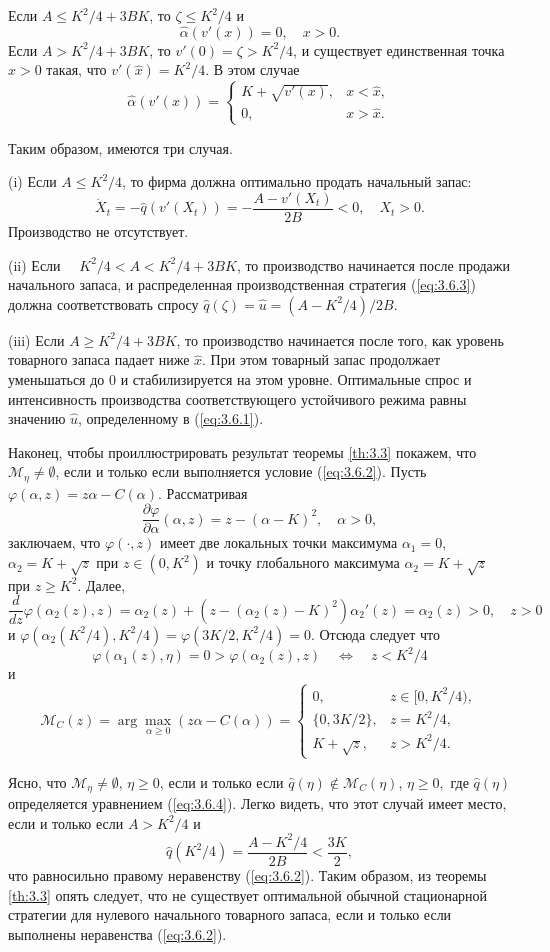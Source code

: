 Если $A\le K^2/4+3BK$, то $\zeta\le K^2/4$ и
$$ \widehat\alpha(v'(x))=0,\quad x>0.$$
Если $A>K^2/4+3BK$, то $v'(0)=\zeta>K^2/4$, и существует единственная точка $\widehat x>0$ такая, что $v'(\widehat x)=K^2/4$. В этом случае
$$ \widehat\alpha(v'(x))=\begin{cases}
K+\sqrt{v'(x)},& x<\widehat x,\\
0,& x>\widehat x.
\end{cases}$$

Таким образом, имеются три случая. 

(i) Если $A\le K^2/4$, то фирма должна оптимально продать начальный запас:
$$ \dot X_t=-\widehat q(v'(X_t))=-\frac{A-v'(X_t)}{2B}<0,\quad X_t>0.$$
Производство не отсутствует.

(ii) Если $\quad K^2/4<A< K^2/4+3BK$, то производство начинается после продажи начального запаса, и распределенная производственная стратегия (\ref{eq:3.6.3}) должна соответствовать спросу $\widehat q(\zeta)=\widehat u=(A-K^2/4)/2B$.

(iii) Если $A\ge K^2/4+3BK$, то производство начинается после того, как уровень товарного запаса падает ниже $\widehat x$. При этом товарный запас продолжает уменьшаться до $0$
и стабилизируется на этом уровне. Оптимальные спрос и интенсивность производства соответствующего устойчивого режима равны значению $\widehat u$, определенному в (\ref{eq:3.6.1}).


Наконец, чтобы проиллюстрировать результат теоремы \ref{th:3.3} покажем, что $\mathscr M_\eta\neq\emptyset$, если и только если выполняется условие (\ref{eq:3.6.2}). Пусть $\varphi(\alpha,z)=z\alpha-C(\alpha)$. Рассматривая
$$ \frac{\partial\varphi}{\partial\alpha}(\alpha,z)=z-(\alpha-K)^2,\quad \alpha>0,$$
заключаем, что $\varphi(\cdot,z)$ имеет две локальных точки максимума $\alpha_1=0$, $\alpha_2=K+\sqrt z$ при $z\in (0, K^2)$ и точку глобального максимума $\alpha_2=K+\sqrt z$ при $z\ge K^2$. Далее,
$$\frac{d}{dz}\varphi(\alpha_2(z),z)=\alpha_2(z)+(z-(\alpha_2(z)-K)^2)\alpha_2'(z) =\alpha_2(z)>0,\quad z>0$$
и $\varphi(\alpha_2(K^2/4),K^2/4)=\varphi(3K/2,K^2/4)=0.$
Отсюда следует что
$$\varphi(\alpha_1(z),\eta)=0>\varphi(\alpha_2(z),z)\quad \iff\quad z<K^2/4$$
и
$$ \mathscr M_C(z)=\arg\max_{\alpha\ge 0}(z\alpha-C(\alpha))=
\begin{cases}
0,& z\in [0,K^2/4),\\
\{0,3K/2\},& z=K^2/4,\\
K+\sqrt z,& z>K^2/4.
\end{cases}$$

Ясно, что $\mathscr M_\eta\neq\emptyset$, $\eta\ge 0$, если и только если
$\widehat q(\eta)\not\in\mathscr M_C(\eta)$, $\eta\ge 0,$ где $\widehat q(\eta)$ определяется уравнением (\ref{eq:3.6.4}).
Легко видеть, что этот случай имеет место, если и только если $A>K^2/4$ и
$$\widehat q(K^2/4)=\frac{A-K^2/4}{2B}<\frac{3K}{2},$$
что равносильно правому неравенству (\ref{eq:3.6.2}). Таким образом, из теоремы \ref{th:3.3} опять следует, что не существует оптимальной обычной стационарной стратегии для нулевого начального товарного запаса, если и только если выполнены неравенства (\ref{eq:3.6.2}).
\clearpage 